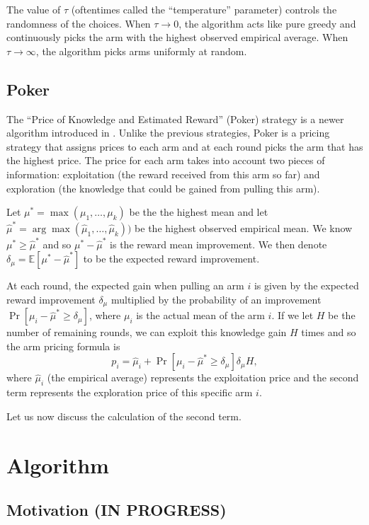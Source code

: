 \documentclass[12pt]{article}
\begin{document}
The value of $\tau$ (oftentimes called the ``temperature'' parameter) controls the randomness of the choices.  When $\tau \to 0$, the algorithm
acts like pure greedy and continuously picks the arm with the highest observed empirical average.  When $\tau \to \infty$, the algorithm picks
arms uniformly at random.

\subsection{Poker}
The ``Price of Knowledge and Estimated Reward'' (Poker) strategy is a newer algorithm introduced in \cite{Mohri}.  Unlike the previous strategies,
Poker is a pricing strategy that assigns prices to each arm and at each round picks the arm that has the highest price.  The price for each arm 
takes into account two pieces of information: exploitation (the reward received from this arm so far) and exploration (the knowledge that could be gained
from pulling this arm).  

Let $\mu^{*} = \max(\mu_1, \ldots, \mu_k)$ be the the highest mean and let $\hat{\mu}^{*} = \arg \max(\hat{\mu}_1, \ldots, \hat{\mu}_k))$ be the highest 
observed empirical mean.  We know $\mu^{*} \ge \hat{\mu}^{*}$ and so $\mu^{*} - \hat{\mu}^{*}$ is the reward mean improvement.  We then denote 
$\delta_{\mu} = \mathbb{E}[\mu^{*} - \hat{\mu}^{*}]$ to be the expected reward improvement.

At each round, the expected gain when pulling an arm $i$ is given by the expected reward improvement $\delta_{\mu}$ multiplied by the probability of an
improvement $\Pr[\mu_i - \hat{\mu}^{*} \ge \delta_{\mu}]$, where $\mu_i$ is the actual mean of the arm $i$.  If we let $H$ be the number of remaining rounds, 
we can exploit this knowledge gain $H$ times and so the arm pricing formula is 
$$
p_i = \hat{\mu}_i + \Pr[\mu_i - \hat{\mu}^{*} \ge \delta_{\mu}] \delta_{\mu} H,
$$
where $\hat{\mu}_i$ (the empirical average) represents the exploitation price and the second term represents the exploration price of this specific arm $i$. 

Let us now discuss the calculation of the second term.
\section{Algorithm}

\subsection{Motivation (IN PROGRESS)}
\end{document}
